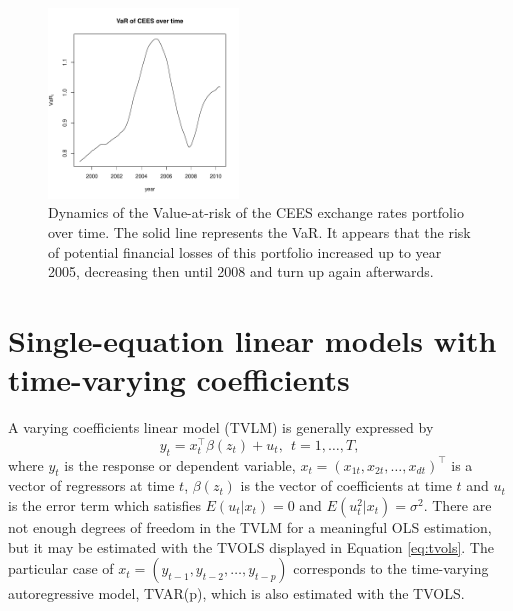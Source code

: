 \begin{figure}[!ht]
\centering
\includegraphics[width = 0.45\textwidth]{Fig7}
\caption{Dynamics of the Value-at-risk of the CEES exchange rates portfolio over time. The solid line represents the VaR. It appears that the risk of potential financial losses of this portfolio increased up to year 2005, decreasing then until 2008 and turn up again afterwards. \label{fig:VaR}}
\end{figure}


\section{Single-equation linear models with time-varying coefficients}\label{sec:single}

A varying coefficients linear model (TVLM) is generally expressed by
\begin{equation}
y_t =  x_t^\top \beta(z_t) + u_t, \ \ t= 1, \ldots, T,
\label{eq:tvlm}
\end{equation}
where $y_t$ is the response or dependent variable, $x_t = (x_{1t}, x_{2t}, \ldots, x_{dt})^\top$ is a vector of regressors at time $t$,  $\beta(z_t)$ is the vector of coefficients at time $t$ and $u_t$ is the error term which satisfies $E(u_t|x_t ) = 0$ and $E(u_t^2|x_t) = \sigma^2$. There are not enough degrees of freedom in the TVLM for a meaningful OLS estimation, but it may be estimated with the TVOLS displayed in Equation \ref{eq:tvols}. The particular case of $x_t = (y_{t-1}, y_{t-2}, \ldots, y_{t-p})$ corresponds to the time-varying autoregressive model, TVAR(p), which is also estimated with the TVOLS. 

